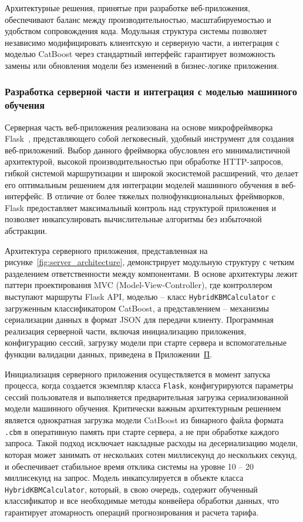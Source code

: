 Архитектурные решения, принятые при разработке веб-приложения, обеспечивают баланс между производительностью, масштабируемостью и удобством сопровождения кода. Модульная структура системы позволяет независимо модифицировать клиентскую и серверную части, а интеграция с моделью CatBoost через стандартный интерфейс гарантирует возможность замены или обновления модели без изменений в бизнес-логике приложения.

\subsubsection{Разработка серверной части и интеграция с моделью машинного обучения}

Серверная часть веб-приложения реализована на основе микрофреймворка Flask~\cite{flask2026docs}, представляющего собой легковесный, удобный инструмент для создания веб-приложений. Выбор данного фреймворка обусловлен его минималистичной архитектурой, высокой производительностью при обработке HTTP-запросов, гибкой системой маршрутизации и широкой экосистемой расширений, что делает его оптимальным решением для интеграции моделей машинного обучения в веб-интерфейс. В отличие от более тяжелых полнофункциональных фреймворков, Flask предоставляет максимальный контроль над структурой приложения и позволяет инкапсулировать вычислительные алгоритмы без избыточной абстракции.

Архитектура серверного приложения, представленная на рисунке~\ref{fig:server_architecture}, демонстрирует модульную структуру с четким разделением ответственности между компонентами. В основе архитектуры лежит паттерн проектирования MVC (Model-View-Controller), где контроллером выступают маршруты Flask API, моделью – класс \texttt{HybridKBMCalculator} с загруженным классификатором CatBoost, а представлением – механизмы сериализации данных в формат JSON для передачи клиенту. Программная реализация серверной части, включая инициализацию приложения, конфигурацию сессий, загрузку модели при старте сервера и вспомогательные функции валидации данных, приведена в Приложении~\hyperref[app:flask_init]{П}.

Инициализация серверного приложения осуществляется в момент запуска процесса, когда создается экземпляр класса \texttt{Flask}, конфигурируются параметры сессий пользователя и выполняется предварительная загрузка сериализованной модели машинного обучения. Критически важным архитектурным решением является однократная загрузка модели CatBoost из бинарного файла формата \texttt{.cbm} в оперативную память при старте сервера, а не при обработке каждого запроса. Такой подход исключает накладные расходы на десериализацию модели, которая может занимать от нескольких сотен миллисекунд до нескольких секунд, и обеспечивает стабильное время отклика системы на уровне 10 – 20 миллисекунд на запрос. Модель инкапсулируется в объекте класса \texttt{HybridKBMCalculator}, который, в свою очередь, содержит обученный классификатор и все необходимые методы конвейера обработки данных, что гарантирует атомарность операций прогнозирования и расчета тарифа.

